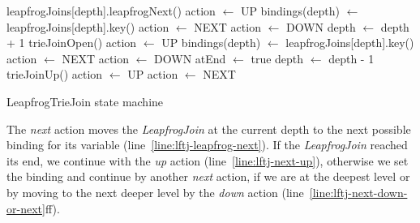 \begin{algorithm}
     {
       {
         {
            leapfrogJoins[depth].leapfrogNext() \; \label{line:lftj-leapfrog-next}
             {
                action $\leftarrow$ UP \; \label{line:lftj-next-up}
            } {
                bindings(depth) $\leftarrow$ leapfrogJoins[depth].key() \; \label{line:lftj-next-down-or-next}
                 {
                    action $\leftarrow$ NEXT
                } {
                    action $\leftarrow$ DOWN
                }
            }
        }
        {
          depth $\leftarrow$ depth + 1 \;
          trieJoinOpen() \; \label{line:lftj-trieJoinOpen}
           {
            action $\leftarrow$ UP \; \label{line:lftj-down-up}
          } {
            bindings(depth) $\leftarrow$ leapfrogJoins[depth].key() \;
           {
             action $\leftarrow$ NEXT \label{line:lftj-down-next}
          } {
            action $\leftarrow$ DOWN
          }
          }
       }
         {
           { \label{line:lftj-atEnd}
            atEnd $\leftarrow$ true \;
          } {
            depth $\leftarrow$ depth - 1 \;
            trieJoinUp() \; \label{line:lftj-trieJoinUp}
             { \label{line:lftj-up-up-next}
                action $\leftarrow$ UP \;
            } {
                action $\leftarrow$ NEXT \;
            }    
          }
        }
      }
    }  
    \caption{LeapfrogTrieJoin state machine}
    \label{alg:leapfrogTrieJoin-state-machine}
\end{algorithm}

The \textit{next} action moves the \textit{LeapfrogJoin} at the current depth to the next possible binding for its variable
(line~\ref{line:lftj-leapfrog-next}).
If the \textit{LeapfrogJoin} reached its end, we continue with the \textit{up} action (line~\ref{line:lftj-next-up}),
otherwise we set the binding and continue by another \textit{next} action, if we are at the deepest level or by moving
to the next deeper level by the \textit{down} action (line~\ref{line:lftj-next-down-or-next}ff).

